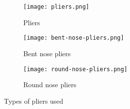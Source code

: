 \documentclass[a4paper,12pt]{article}
\begin{document}
						\begin{figure}[H]
							\begin{subfigure}{.5\textwidth}
								\centering				
								\texttt{[image: pliers.png]}
								\caption{Pliers}
								\label{subfig:pliers}
							\end{subfigure}							
							\begin{subfigure}{.5\textwidth}
								\centering
								\texttt{[image: bent-nose-pliers.png]}
								\caption{Bent nose pliers}
								\label{subfig:bent-nose-pliers}
							\end{subfigure}
						\begin{center}
							\begin{subfigure}{.5\textwidth}
								\centering
								\texttt{[image: round-nose-pliers.png]}
								\caption{Round nose pliers}
								\label{subfig:round-nose-pliers}
							\end{subfigure}
							\caption{Types of pliers used}
							\label{fig:types-of-pliers}
						\end{center}
							
						\end{figure}
				
				\newpage		
\end{document}
